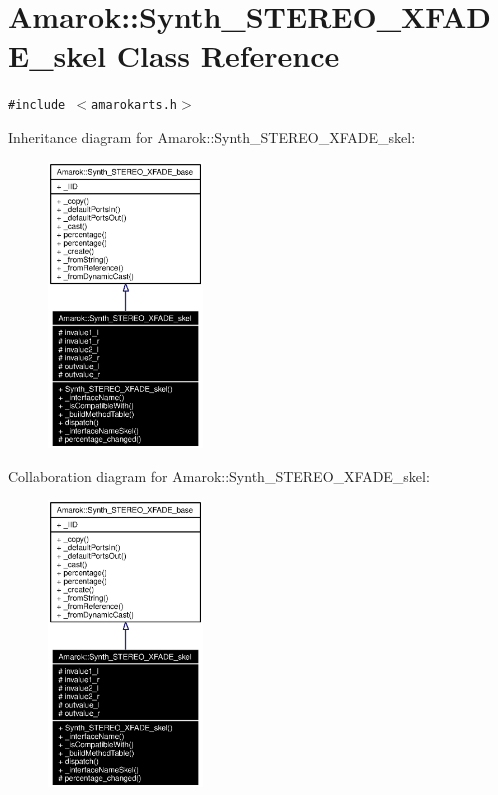 \section{Amarok::Synth\_\-STEREO\_\-XFADE\_\-skel Class Reference}
\label{classAmarok_1_1Synth__STEREO__XFADE__skel}
{\tt \#include $<$amarokarts.h$>$}

Inheritance diagram for Amarok::Synth\_\-STEREO\_\-XFADE\_\-skel:\begin{figure}[H]
\begin{center}
\leavevmode
\includegraphics[width=116pt]{classAmarok_1_1Synth__STEREO__XFADE__skel__inherit__graph}
\end{center}
\end{figure}
Collaboration diagram for Amarok::Synth\_\-STEREO\_\-XFADE\_\-skel:\begin{figure}[H]
\begin{center}
\leavevmode
\includegraphics[width=116pt]{classAmarok_1_1Synth__STEREO__XFADE__skel__coll__graph}
\end{center}
\end{figure}

